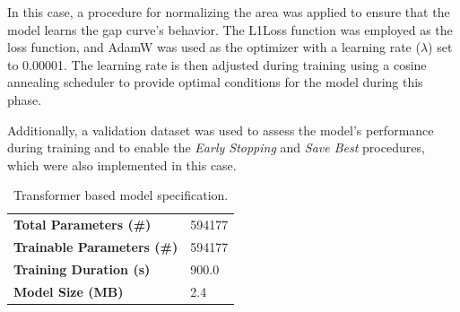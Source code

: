 In this case, a procedure for normalizing the area was applied to ensure that the
model learns the gap curve's behavior.
The L1Loss\cite{loss} function was employed as the loss function, and AdamW\cite{adamw} was used as the
optimizer with a learning rate ($\lambda$) set to 0.00001.
The learning rate is then adjusted during training using a cosine annealing scheduler\cite{scheduler1}\cite{scheduler2}
to provide optimal conditions for the model during this phase.

Additionally, a validation dataset was used to assess the model's
performance during training and to enable the
\textit{Early Stopping}\cite{es} and \textit{Save Best} procedures,
which were also implemented in this case.


\begin{table}[H]
	\begin{center}
		\begin{tabular}[c]{l|l}
			\textbf{Total Parameters (\#)}     & 594177 \\
			\textbf{Trainable Parameters (\#)} & 594177 \\
			\textbf{Training Duration (s)}     & 900.0  \\
			\textbf{Model Size (MB)}           & 2.4
		\end{tabular}
	\end{center}
	\caption{Transformer based model specification.}\label{tab:gabspecs}
\end{table}

